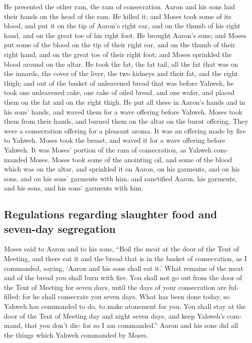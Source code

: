 \begin{paracol}{2}
\begin{otherlanguage}{english}
 He presented the other ram, the ram of consecration.
Aaron and his sons laid their hands on the head of the ram.
 He killed it; and Moses took some of its blood, and put
it on the tip of Aaron's right ear, and on the thumb of his right hand,
and on the great toe of his right foot.  He brought
Aaron's sons; and Moses put some of the blood on the tip of their right
ear, and on the thumb of their right hand, and on the great toe of their
right foot; and Moses sprinkled the blood around on the altar.
 He took the fat, the fat tail, all the fat that was on
the innards, the cover of the liver, the two kidneys and their fat, and
the right thigh;  and out of the basket of unleavened
bread that was before Yahweh, he took one unleavened cake, one cake of
oiled bread, and one wafer, and placed them on the fat and on the right
thigh.  He put all these in Aaron's hands and in his
sons' hands, and waved them for a wave offering before Yahweh.
 Moses took them from their hands, and burned them on the
altar on the burnt offering. They were a consecration offering for a
pleasant aroma. It was an offering made by fire to Yahweh.
 Moses took the breast, and waved it for a wave offering
before Yahweh. It was Moses' portion of the ram of consecration, as
Yahweh commanded Moses.  Moses took some of the anointing
oil, and some of the blood which was on the altar, and sprinkled it on
Aaron, on his garments, and on his sons, and on his sons' garments with
him, and sanctified Aaron, his garments, and his sons, and his sons'
garments with him.

\hypertarget{regulations-regarding-slaughter-food-and-seven-day-segregation}{%
\subsection{Regulations regarding slaughter food and seven-day
segregation}\label{regulations-regarding-slaughter-food-and-seven-day-segregation}}

 Moses said to Aaron and to his sons, ``Boil the meat at
the door of the Tent of Meeting, and there eat it and the bread that is
in the basket of consecration, as I commanded, saying, `Aaron and his
sons shall eat it.'  What remains of the meat and of the
bread you shall burn with fire.  You shall not go out
from the door of the Tent of Meeting for seven days, until the days of
your consecration are fulfilled: for he shall consecrate you seven days.
 What has been done today, so Yahweh has commanded to do,
to make atonement for you.  You shall stay at the door of
the Tent of Meeting day and night seven days, and keep Yahweh's command,
that you don't die: for so I am commanded.''  Aaron and
his sons did all the things which Yahweh commanded by Moses.


\end{otherlanguage}
\end{paracol}
